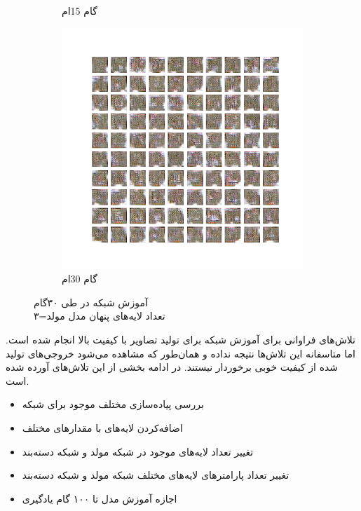 \documentclass[12pt, a4paper]{book}
\begin{document}
\begin{figure}[h]
\begin{subfigure}{0.3\linewidth}
        \caption{گام 15ام}
    \end{subfigure}
    \begin{subfigure}{0.3\linewidth}
        \includegraphics[width=\linewidth]{images/dcgan/nlayer3/generated_img_30.png}
        \caption{گام 30ام}
    \end{subfigure}
    \caption{آموزش شبکه  در طی ۳۰گام\\ تعداد لایه‌های پنهان مدل مولد=۳}
    \label{dcgan_nlayer3}
\end{figure}

تلاش‌های فراوانی برای آموزش شبکه  برای تولید تصاویر با کیفیت بالا انجام شده است.
اما متاسفانه این تلاش‌ها نتیجه نداده و همان‌طور که مشاهده می‌شود خروجی‌های تولید شده از کیفیت
خوبی برخوردار نیستند. در ادامه بخشی از این تلاش‌های آورده شده است.

\begin{itemize}
    \item بررسی پیاده‌سازی مختلف موجود برای شبکه 
    \item اضافه‌کردن لایه‌های  با مقدار‌های مختلف
    \item تغییر تعداد لایه‌های موجود در شبکه‌ مولد و شبکه دسته‌بند
    \item تغییر تعداد پارامتر‌های لایه‌های مختلف شبکه مولد و شبکه دسته‌بند
    \item اجازه آموزش مدل تا ۱۰۰ گام یادگیری
\end{itemize}
\end{document}
